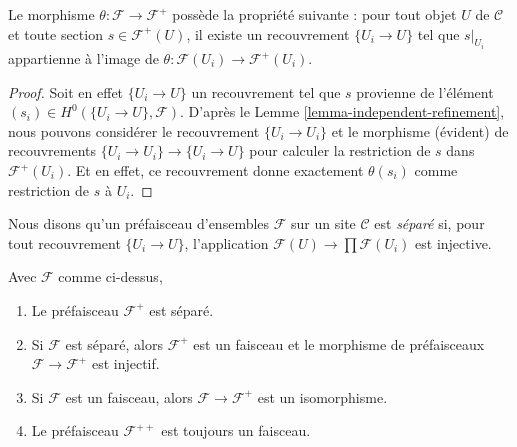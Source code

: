 \begin{lemma}
\label{lemma-plus-surjective}
Le morphisme $\theta : \mathcal{F} \to \mathcal{F}^+$ possède la propriété
suivante : pour tout objet $U$ de $\mathcal{C}$ et toute section
$s \in \mathcal{F}^+(U)$, il existe un recouvrement $\{U_i \to U\}$
tel que $s|_{U_i}$ appartienne à l’image de $\theta : \mathcal{F}(U_i)
\to \mathcal{F}^{+}(U_i)$.
\end{lemma}

\begin{proof}
Soit en effet $\{U_i \to U\}$ un recouvrement tel que $s$ provienne
de l’élément $(s_i) \in H^0(\{U_i \to U\}, \mathcal{F})$.
D’après le Lemme \ref{lemma-independent-refinement}, nous pouvons
considérer le recouvrement $\{U_i \to U_i\}$ et le morphisme (évident)
de recouvrements $\{U_i \to U_i\} \to \{U_i \to U\}$ pour calculer la
restriction de $s$ dans $\mathcal{F}^+(U_i)$. Et en effet,
ce recouvrement donne exactement $\theta(s_i)$ comme restriction
de $s$ à $U_i$.
\end{proof}

\begin{definition}
\label{definition-separated}
Nous disons qu’un préfaisceau d’ensembles $\mathcal{F}$ sur un site
$\mathcal{C}$ est {\it séparé} si, pour tout recouvrement
$\{U_i \rightarrow U\}$, l’application
$\mathcal{F}(U) \to \prod \mathcal{F}(U_i)$ est injective.
\end{definition}

\begin{theorem}
\label{theorem-plus}
Avec $\mathcal{F}$ comme ci-dessus,
\begin{enumerate}
\item
\label{item-sep}
Le préfaisceau $\mathcal{F}^+$ est séparé.
\item
\label{item-sheaf}
Si $\mathcal{F}$ est séparé, alors $\mathcal{F}^+$ est un faisceau
et le morphisme de préfaisceaux $\mathcal{F} \to \mathcal{F}^+$ est injectif.
\item
\label{item-plus-iso}
Si $\mathcal{F}$ est un faisceau, alors $\mathcal{F} \to \mathcal{F}^+$
est un isomorphisme.
\item
\label{item-plusplus}
Le préfaisceau $\mathcal{F}^{++}$ est toujours un faisceau.
\end{enumerate}
\end{theorem}

